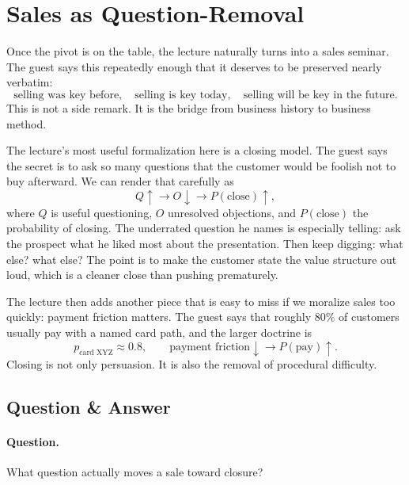 \section{Sales as Question-Removal}

Once the pivot is on the table, the lecture naturally turns into a sales seminar. The guest says this repeatedly enough that it deserves to be preserved nearly verbatim:
\begin{equation}
\text{selling was key before},
\quad
\text{selling is key today},
\quad
\text{selling will be key in the future}.
\end{equation}
This is not a side remark. It is the bridge from business history to business method.

The lecture's most useful formalization here is a closing model. The guest says the secret is to ask so many questions that the customer would be foolish not to buy afterward. We can render that carefully as
\begin{equation}
Q\uparrow \to O\downarrow \to P(\text{close})\uparrow,
\end{equation}
where \(Q\) is useful questioning, \(O\) unresolved objections, and \(P(\text{close})\) the probability of closing. The underrated question he names is especially telling: ask the prospect what he liked most about the presentation. Then keep digging: what else? what else? The point is to make the customer state the value structure out loud, which is a cleaner close than pushing prematurely.

The lecture then adds another piece that is easy to miss if we moralize sales too quickly: payment friction matters. The guest says that roughly \(80\%\) of customers usually pay with a named card path, and the larger doctrine is
\begin{equation}
p_{\text{card XYZ}} \approx 0.8,
\qquad
\text{payment friction}\downarrow \to P(\text{pay})\uparrow.
\end{equation}
Closing is not only persuasion. It is also the removal of procedural difficulty.

\subsection{Question \& Answer}

\paragraph{Question.} What question actually moves a sale toward closure?

